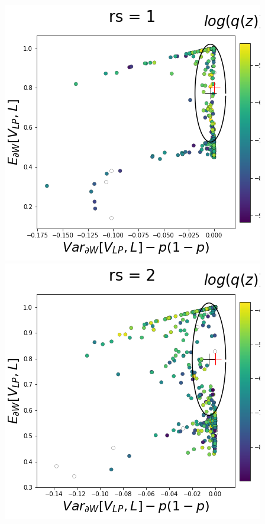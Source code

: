 \documentclass[11pt]{article}
\begin{document}
\begin{center}
\includegraphics[scale=0.33]{figs/T_x_SC_pvar_reduced_c=0_p=80_rs=1.png}
\includegraphics[scale=0.33]{figs/T_x_SC_pvar_reduced_c=0_p=80_rs=2.png}

\end{center}
\end{document}
